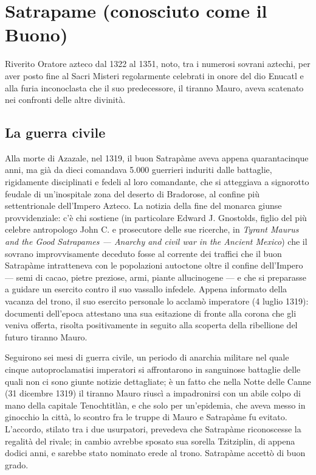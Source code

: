 \documentclass[italian,a4paper]{article}
\begin{document}
 \section*{Satrapame (conosciuto come il Buono)}
 Riverito Oratore azteco dal 1322
 al 1351, noto, tra i numerosi sovrani aztechi, per aver posto fine al
 Sacri Misteri regolarmente celebrati in onore del dio Enucatl e alla
 furia inconoclasta che il suo predecessore, il tiranno Mauro, aveva
 scatenato nei confronti delle altre divinità.
 \subsection*{La guerra civile}
 Alla morte di Azazale, nel 1319, il buon Satrapàme aveva appena
 quarantacinque anni, ma già da dieci comandava 5.000 guerrieri induriti
 dalle battaglie, rigidamente disciplinati e fedeli al loro comandante, che
 si atteggiava a signorotto feudale di un'inospitale zona del deserto di
 Bradorose, al confine più settentrionale dell'Impero Azteco.
 La notizia della fine del monarca giunse provvidenziale: c'è chi sostiene
 (in particolare Edward J. Gnostolds, figlio del più celebre antropologo
 John C. e prosecutore delle sue ricerche, in \emph{Tyrant Maurus and the Good
 Satrapames --- Anarchy and civil war in the Ancient Mexico}) che il sovrano
 improvvisamente deceduto fosse al corrente dei traffici che il buon
 Satrapàme intratteneva con le popolazioni autoctone oltre il confine
 dell'Impero --- semi di cacao, pietre preziose, armi, piante allucinogene --- e
 che si preparasse a guidare un esercito contro il suo vassallo infedele.
 Appena informato della vacanza del trono, il suo esercito personale lo
 acclamò imperatore (4 luglio 1319): documenti dell'epoca attestano una sua
 esitazione di fronte alla corona che gli veniva offerta, risolta
 positivamente in seguito alla scoperta della ribellione del futuro tiranno
 Mauro.
  
 Seguirono sei mesi di guerra civile, un periodo di anarchia militare nel
 quale cinque autoproclamatisi imperatori si affrontarono in sanguinose
 battaglie delle quali non ci sono giunte notizie dettagliate; è un fatto
 che nella Notte delle Canne (31 dicembre 1319) il tiranno Mauro riuscì a
 impadronirsi con un abile colpo di mano della capitale Tenochtitlàn, e che
 solo per un'epidemia, che aveva messo in ginocchio la città, lo scontro fra
 le truppe di Mauro e Satrapàme fu evitato. L'accordo, stilato tra i due
 usurpatori, prevedeva che Satrapàme riconoscesse la regalità del rivale; in
 cambio avrebbe sposato sua sorella Tzitziplin, di appena dodici anni, e
 sarebbe stato nominato erede al trono.
 Satrapàme accettò di buon grado.
\end{document}
